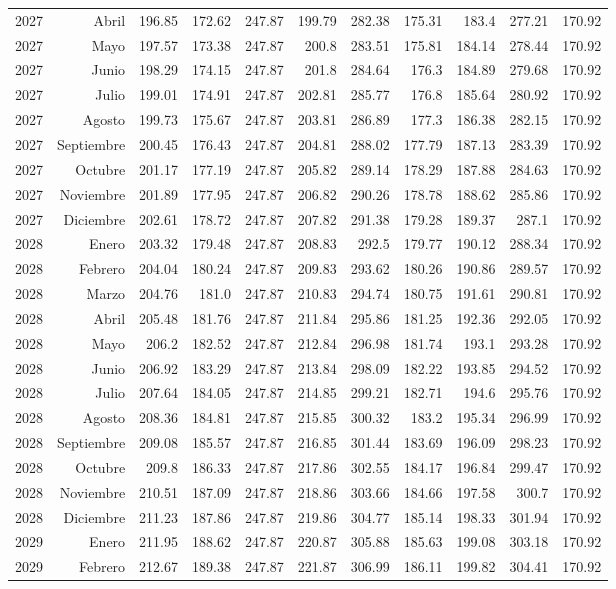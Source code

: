 \documentclass{article}%
\begin{document}
\begin{longtable}{|l r|r|r|r|r|r|r|r|r|r|}
2027&Abril&196.85&172.62&247.87&199.79&282.38&175.31&183.4&277.21&170.92\\%
2027&Mayo&197.57&173.38&247.87&200.8&283.51&175.81&184.14&278.44&170.92\\%
2027&Junio&198.29&174.15&247.87&201.8&284.64&176.3&184.89&279.68&170.92\\%
2027&Julio&199.01&174.91&247.87&202.81&285.77&176.8&185.64&280.92&170.92\\%
2027&Agosto&199.73&175.67&247.87&203.81&286.89&177.3&186.38&282.15&170.92\\%
2027&Septiembre&200.45&176.43&247.87&204.81&288.02&177.79&187.13&283.39&170.92\\%
2027&Octubre&201.17&177.19&247.87&205.82&289.14&178.29&187.88&284.63&170.92\\%
2027&Noviembre&201.89&177.95&247.87&206.82&290.26&178.78&188.62&285.86&170.92\\%
2027&Diciembre&202.61&178.72&247.87&207.82&291.38&179.28&189.37&287.1&170.92\\%
2028&Enero&203.32&179.48&247.87&208.83&292.5&179.77&190.12&288.34&170.92\\%
2028&Febrero&204.04&180.24&247.87&209.83&293.62&180.26&190.86&289.57&170.92\\%
2028&Marzo&204.76&181.0&247.87&210.83&294.74&180.75&191.61&290.81&170.92\\%
2028&Abril&205.48&181.76&247.87&211.84&295.86&181.25&192.36&292.05&170.92\\%
2028&Mayo&206.2&182.52&247.87&212.84&296.98&181.74&193.1&293.28&170.92\\%
2028&Junio&206.92&183.29&247.87&213.84&298.09&182.22&193.85&294.52&170.92\\%
2028&Julio&207.64&184.05&247.87&214.85&299.21&182.71&194.6&295.76&170.92\\%
2028&Agosto&208.36&184.81&247.87&215.85&300.32&183.2&195.34&296.99&170.92\\%
2028&Septiembre&209.08&185.57&247.87&216.85&301.44&183.69&196.09&298.23&170.92\\%
2028&Octubre&209.8&186.33&247.87&217.86&302.55&184.17&196.84&299.47&170.92\\%
2028&Noviembre&210.51&187.09&247.87&218.86&303.66&184.66&197.58&300.7&170.92\\%
2028&Diciembre&211.23&187.86&247.87&219.86&304.77&185.14&198.33&301.94&170.92\\%
2029&Enero&211.95&188.62&247.87&220.87&305.88&185.63&199.08&303.18&170.92\\%
2029&Febrero&212.67&189.38&247.87&221.87&306.99&186.11&199.82&304.41&170.92\\%

\end{longtable}
\end{document}

